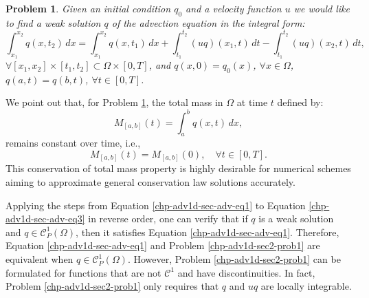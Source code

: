 \theoremstyle{plain}
\newtheorem{prob}{Problem}[chapter]
\begin{prob}
	\label{chp-adv1d-sec2-prob1}
	Given an initial condition ${q}_0$ and a velocity function $u$  we would like to find a weak solution ${q}$
	of the advection equation in the integral form:
	\begin{equation*}
	        \int_{x_1}^{x_2} {q}(x, t_2) \,dx =
       		\int_{x_1}^{x_2} {q}(x, t_1) \,dx +
        	\int_{t_1}^{t_2} {(uq)}(x_1, t) \,dt -
		\int_{t_1}^{t_2}{(uq)}(x_2, t) \,dt ,
	\end{equation*}
	$\forall [x_1, x_2]\times[t_1, t_2] \subset \Omega \times [0,T]$,
	and
	${q}(x,0) = {q}_0(x)$, $\forall x \in \Omega$, $q(a,t)=q(b,t)$, $\forall t \in [0,T]$.
\end{prob}
We point out that, for Problem \ref{chp-adv1d-sec2-prob1}, the total mass in $\Omega$ at time $t$ defined by:
\begin{equation*}
{M}_{[a,b]}(t) = \int_{a}^{b} q(x,t) \,dx,
\end{equation*}
remains constant over time, i.e.,
\begin{equation*}
	{M}_{[a,b]}(t) = {M}_{[a,b]}(0), \quad \forall t \in [0,T].
\end{equation*}
This conservation of total mass property is highly desirable for numerical schemes aiming
to approximate general conservation law solutions accurately.

Applying the steps from Equation \eqref{chp-adv1d-sec-adv-eq1} to Equation \eqref{chp-adv1d-sec-adv-eq3} in reverse order,
one can verify that if ${q}$ is a weak solution and $q \in \mathcal{C}^1_P{(\Omega)}$, then it satisfies Equation \eqref{chp-adv1d-sec-adv-eq1}.
Therefore, Equation \eqref{chp-adv1d-sec-adv-eq1} and Problem \eqref{chp-adv1d-sec2-prob1} are equivalent when $q \in \mathcal{C}^1_P{(\Omega)}$.
However, Problem \eqref{chp-adv1d-sec2-prob1} can be formulated for functions that are not $\mathcal{C}^1$ and have discontinuities.
In fact, Problem \eqref{chp-adv1d-sec2-prob1} only requires that $q$ and $uq$ are locally integrable.


